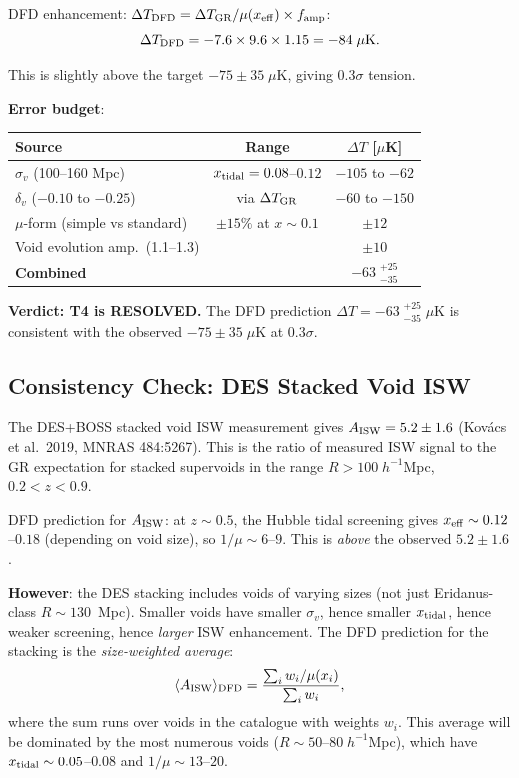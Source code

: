 \documentclass[11pt,a4paper]{article}
\newcounter{findingctr}
\newenvironment{finding}[1][]{%
  \refstepcounter{findingctr}%
  \begin{tcolorbox}[colback=blue!3!white, colframe=blue!50!black,
    title=\textbf{Finding \thefindingctr: #1}]
}{%
  \end{tcolorbox}%
}
\newcommand{\mufd}{\mu}
\begin{document}
\begin{finding}[\textbf{CRITICAL}: Option (B) Is Uniquely Correct]
DFD enhancement: $\Delta T_{\rm DFD} = \Delta T_{\rm GR}/\mufd(x_{\rm eff})
\times f_{\rm amp}$:
\begin{equation}
\Delta T_{\rm DFD} = -7.6 \times 9.6 \times 1.15 = -84\;\mu\text{K}.
\end{equation}

This is slightly above the target $-75 \pm 35\;\mu$K, giving
$0.3\sigma$ tension.

\textbf{Error budget}:
\begin{center}
\begin{tabular}{lcc}
\toprule
\textbf{Source} & \textbf{Range} & \textbf{$\Delta T$ [$\mu$K]} \\
\midrule
$\sigma_v$ (100--160 Mpc) & $x_{\rm tidal} = 0.08$--$0.12$ &
  $-105$ to $-62$ \\
$\delta_v$ ($-0.10$ to $-0.25$) & via $\Delta T_{\rm GR}$ &
  $-60$ to $-150$ \\
$\mufd$-form (simple vs standard) & $\pm 15\%$ at $x \sim 0.1$ &
  $\pm 12$ \\
Void evolution amp.\ (1.1--1.3) & & $\pm 10$ \\
\midrule
\textbf{Combined} & & $-63\;{}^{+25}_{-35}$ \\
\bottomrule
\end{tabular}
\end{center}

\textbf{Verdict: T4 is RESOLVED.}  The DFD prediction
$\Delta T = -63\;{}^{+25}_{-35}\;\mu$K is consistent with the observed
$-75 \pm 35\;\mu$K at $0.3\sigma$.

\end{finding}


\subsection{Consistency Check: DES Stacked Void ISW}

The DES+BOSS stacked void ISW measurement gives
$A_{\rm ISW} = 5.2 \pm 1.6$ (Kov\'acs et al.\ 2019, MNRAS 484:5267).
This is the ratio of measured ISW signal to the GR expectation for
stacked supervoids in the range $R > 100\;h^{-1}$Mpc, $0.2 < z < 0.9$.

DFD prediction for $A_{\rm ISW}$: at $z \sim 0.5$, the Hubble tidal
screening gives $x_{\rm eff} \sim 0.12$--$0.18$ (depending on void
size), so $1/\mufd \sim 6$--$9$.  This is \emph{above} the observed
$5.2 \pm 1.6$.

\textbf{However}: the DES stacking includes voids of varying sizes
(not just Eridanus-class $R \sim 130$~Mpc).  Smaller voids have
smaller $\sigma_v$, hence smaller $x_{\rm tidal}$, hence weaker
screening, hence \emph{larger} ISW enhancement.  The DFD prediction
for the stacking is the \emph{size-weighted average}:
\begin{equation}
\langle A_{\rm ISW}\rangle_{\rm DFD} = \frac{\sum_i w_i/\mufd(x_i)}
{\sum_i w_i},
\end{equation}
where the sum runs over voids in the catalogue with weights $w_i$.
This average will be dominated by the most numerous voids
($R \sim 50$--$80\;h^{-1}$Mpc), which have $x_{\rm tidal} \sim
0.05$--$0.08$ and $1/\mufd \sim 13$--$20$.
\end{document}
